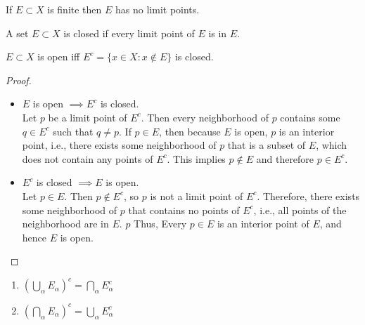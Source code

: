 \begin{corollary}
	If $E \subset X$ is finite then $E$ has no limit points.
\end{corollary}

\begin{definition}
	A set $E \subset X$ is closed if every limit point of $E$ is in $E$.
\end{definition}
\begin{thm}[23]
	$E \subset X$ is open iff $E^{c}=\{x \in X: x \not\in E\}$ is closed.
	\begin{proof}
		\label{prf:open_closed}
		\hfill
		\begin{itemize}
			\item $E$ is open $\implies E^{c}$ is closed.\\
			      Let $p$ be a limit point of $E^{c}$. Then every neighborhood of $p$ contains some $q \in E^{c}$ such that $q \neq p$. If $p \in E$, then because $E$ is open, $p$ is an interior point, i.e., there exists some neighborhood of $p$ that is a subset of $E$, which does not contain any points of $E^{c}$.
			      This implies $p \not\in E$ and therefore $p \in E^{c}$.
			\item $E^{c}$ is closed $\implies E$ is open.\\
			      Let $p \in E$. Then $p \not\in E^{c}$, so $p$ is not a limit point of $E^{c}$.
			      Therefore, there exists some neighborhood of $p$ that contains no points of $E^{c}$, i.e., all points of the neighborhood are in $E$. $p$
			      Thus, Every $p \in E$ is an interior point of $E$, and hence $E$ is open.
		\end{itemize}
	\end{proof}
\end{thm}

\begin{thm}
	\hfill
	\begin{enumerate}[label=(\alph*)]
		\item $(\bigcup _{\alpha} E_{\alpha})^{c}=\bigcap_{\alpha} E_{\alpha}^{c}$
		\item $(\bigcap_{\alpha} E_{\alpha})^{c}=\bigcup_{\alpha} E_{\alpha}^{c}$
	\end{enumerate}
\end{thm}

